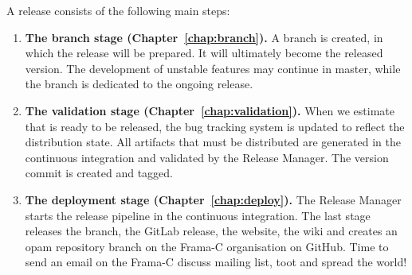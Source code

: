 A \FramaC release consists of the following main steps:
\begin{enumerate}

\item \textbf{The branch stage (Chapter~\ref{chap:branch}).} A branch is
  created, in which the release  will be prepared. It will ultimately become the
  released version. The development of unstable features may continue in master,
  while the branch is dedicated to the ongoing release.

\item \textbf{The validation stage (Chapter~\ref{chap:validation}).} When we
  estimate that \FramaC is ready to be released, the bug tracking system is
  updated to reflect the distribution state. All artifacts that must be
  distributed are generated in the continuous integration and validated by the
  Release Manager. The version commit is created and tagged.

\item \textbf{The deployment stage (Chapter~\ref{chap:deploy}).} The Release
  Manager starts the release pipeline in the continuous integration. The last
  stage releases the branch, the GitLab release, the website, the wiki and
  creates an opam repository branch on the Frama-C organisation on GitHub. Time
  to send an email on the Frama-C discuss mailing list, toot and spread the
  world!

\end{enumerate}



